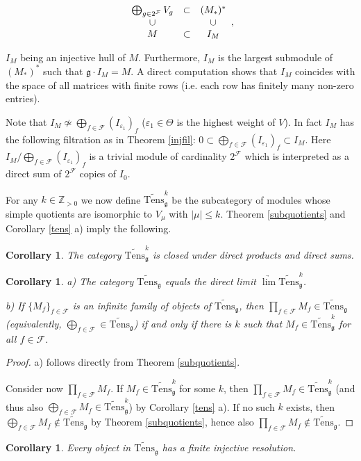 \documentclass{birkmult}
\newcounter{theorem}
\newtheorem{corollary}[theo]{Corollary}
\newcommand {\ZZ} {\mathbb {Z}}
\renewcommand{\gg}{\mathfrak{g}}
\newcommand{\lind}{\widetilde{\mathrm{Tens}}}
\begin{document}
$$\begin{array}[c]{ccc}
\bigoplus_{g\in 2^{\mathcal F}}V_g&\subset &(M_*)^*\\
\cup &&\cup \\
M&\subset &I_M
\end{array},$$

\noindent $I_M$ being an injective hull of $M$. Furthermore, $I_M$ is the
largest submodule of $(M_*)^*$ such that $\gg\cdot I_M=M$. A direct computation
shows that $I_M$ coincides with the space of all matrices with finite rows
(i.e. each row has finitely many non-zero entries).


Note that $I_M\not\simeq\bigoplus_{f\in\mathcal F}(I_{\varepsilon_1})_f$
($\varepsilon_1\in\Theta$ is the highest weight of $V$). In fact
$I_M$ has the following filtration as in Theorem \ref{injfil}:
$0\subset\bigoplus_{f\in\mathcal F}(I_{\varepsilon_1})_f\subset I_M$.
Here $I_M/\bigoplus_{f\in\mathcal F}(I_{\varepsilon_1})_f$ is a trivial
module of cardinality $2^{\mathcal F}$ which is interpreted as a
direct sum of $2^{\mathcal F}$ copies of $I_0$.


For any $k\in\ZZ_{>0}$ we now define $\lind^k_\gg$ be the subcategory
of modules whose simple quotients are isomorphic to $V_\mu$ with
$|\mu|\leq k$. Theorem \ref{subquotients} and Corollary \ref{tens} a) imply
the following.
\begin{corollary}\label{dircat} The category $\lind^k_\gg$ is closed
under direct products and direct sums.
\end{corollary}
\begin{corollary}
a) The category $\lind_\gg$ equals the direct limit $\underrightarrow{\lim}
\lind_\gg^k$.

b) If $\{M_f\}_{f\in\mathcal F}$ is an infinite family of objects of
$\lind_\gg$, then $\prod_{f\in\mathcal F}M_f\in\lind_\gg$ (equivalently,
$\bigoplus_{f\in\mathcal F}\in\lind_\gg$) if and only if there is $k$ such that $M_f\in\lind_\gg^k$
for all $f\in\mathcal F$.
\end{corollary}
\begin{proof}
a) follows directly from Theorem \ref{subquotients}.

Consider now $\prod_{f\in\mathcal F}M_f$.
If $M_f\in\lind_\gg^k$ for some $k$, then 
$\prod_{f\in\mathcal F}M_f\in
\lind_\gg^k$ (and thus also $\bigoplus_{f\in\mathcal  F}M_f\in\lind_\gg^k$) 
by Corollary \ref{tens} a). If no such $k$
exists, then $\bigoplus_{f\in\mathcal F} M_f\notin\lind_\gg$ 
by Theorem \ref{subquotients}, hence also $\prod_{f\in\mathcal F}M_f\notin\lind_\gg$.
\end{proof}
\begin{corollary}\label{resolution} Every object in $\lind_\gg$ has a
 finite injective resolution.
\end{corollary}
\end{document}
